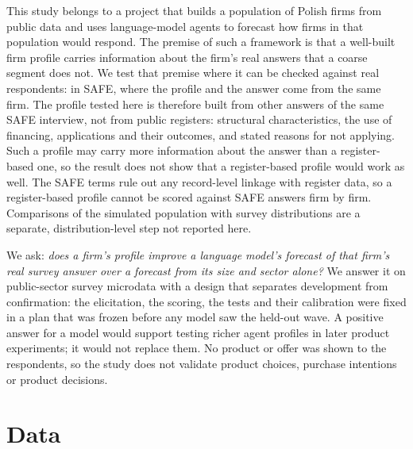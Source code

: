 \documentclass[11pt]{article}
\begin{document}
This study belongs to a project that builds a population of Polish firms from public data and uses language-model
agents to forecast how firms in that population would respond. The premise of such a framework is that a well-built
firm profile carries information about the firm's real answers that a coarse segment does not. We test that premise
where it can be checked against real respondents: in SAFE, where the profile and the answer come from the same firm.
The profile tested here is therefore built from other answers of the same SAFE interview, not from public
registers: structural characteristics, the use of financing, applications and their outcomes, and stated reasons for
not applying. Such a profile may carry more information about the answer than a register-based one, so the result
does not show that a register-based profile would work as well. The SAFE terms rule out any record-level linkage with
register data, so a register-based profile cannot be scored against SAFE answers firm by firm. Comparisons of the simulated population with survey distributions are a separate,
distribution-level step not reported here.

We ask: \emph{does a firm's profile improve a language model's forecast of that firm's real survey answer over a
forecast from its size and sector alone?} We answer it on public-sector survey microdata with a design that separates
development from confirmation: the elicitation, the scoring, the tests and their calibration were fixed in a plan
that was frozen before any model saw the held-out wave. A positive answer for a model would support testing richer
agent profiles in later product experiments; it would not replace them. No product or offer was shown to the
respondents, so the study does not validate product choices, purchase intentions or product decisions.

\section{Data}
\end{document}
